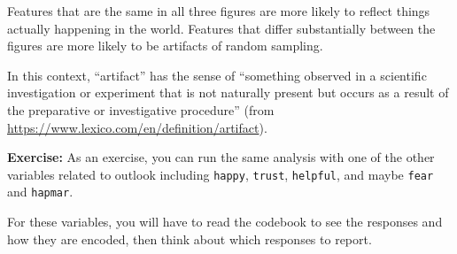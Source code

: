 Features that are the same in all three figures are more likely to
reflect things actually happening in the world. Features that differ
substantially between the figures are more likely to be artifacts of
random sampling.

In this context, ``artifact'' has the sense of ``something observed in a
scientific investigation or experiment that is not naturally present but
occurs as a result of the preparative or investigative procedure'' (from
\url{https://www.lexico.com/en/definition/artifact}).

\textbf{Exercise:} As an exercise, you can run the same analysis with
one of the other variables related to outlook including
\passthrough{\lstinline!happy!}, \passthrough{\lstinline!trust!},
\passthrough{\lstinline!helpful!}, and maybe
\passthrough{\lstinline!fear!} and \passthrough{\lstinline!hapmar!}.

For these variables, you will have to read the codebook to see the
responses and how they are encoded, then think about which responses to
report.

